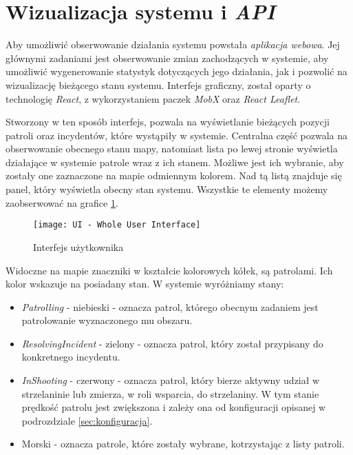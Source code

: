 \section{Wizualizacja systemu i \emph{API}}

\par Aby umożliwić obserwowanie działania systemu powstała \emph{aplikacja webowa}. Jej głównymi zadaniami jest obserwowanie zmian zachodzących w systemie, aby umożliwić wygenerowanie statystyk dotyczących jego działania, jak i pozwolić na wizualizację bieżącego stanu systemu. Interfejs graficzny, został oparty o technologię \emph{React}\cite{REACT_SITE}, z wykorzystaniem paczek \emph{MobX}\cite{MOBX_SITE} oraz \emph{React Leaflet}\cite{REACT_LEAFLET_SITE}.

\par Stworzony w ten sposób interfejs, pozwala na wyświetlanie bieżących pozycji patroli oraz incydentów, które wystąpiły w systemie. Centralna część pozwala na obserwowanie obecnego stanu mapy, natomiast lista po lewej stronie wyświetla działające w systemie patrole wraz z ich stanem. Możliwe jest ich wybranie, aby zostały one zaznaczone na mapie odmiennym kolorem. Nad tą listą znajduje się panel, który wyświetla obecny stan systemu. Wszystkie te elementy możemy zaobserwować na grafice \ref{fig:uiWhole}.

\begin{figure}
    \centering
    \texttt{[image: UI - Whole User Interface]}
    \caption{Interfejs użytkownika}
    \label{fig:uiWhole}
\end{figure}

\par Widoczne na mapie znaczniki w kształcie kolorowych kółek, są patrolami. Ich kolor wskazuje na posiadany stan. W systemie wyróżniamy stany:
\begin{itemize}
    \item \emph{Patrolling} - niebieski - oznacza patrol, którego obecnym zadaniem jest patrolowanie wyznaczonego mu obszaru.
    \item \emph{ResolvingIncident} - zielony - oznacza patrol, który został przypisany do konkretnego incydentu.
    \item \emph{InShooting} - czerwony - oznacza patrol, który bierze aktywny udział w strzelaninie lub zmierza, w roli wsparcia, do strzelaniny. W tym stanie prędkość patrolu jest zwiększona i zależy ona od konfiguracji opisanej w podrozdziale \ref{sec:konfiguracja}.
    \item Morski - oznacza patrole, które zostały wybrane, kotrzystając z listy patroli.
\end{itemize}

